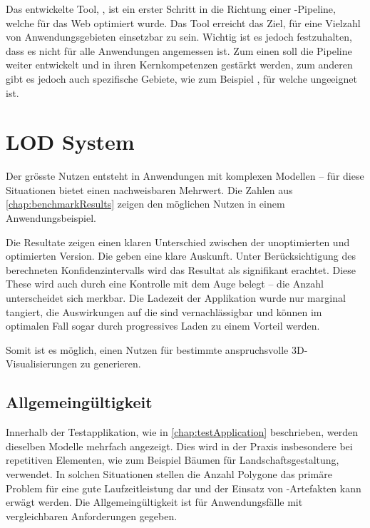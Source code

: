 Das entwickelte Tool, , ist ein erster Schritt in die Richtung einer -Pipeline, welche für das Web optimiert wurde. Das Tool erreicht das Ziel, für eine Vielzahl von Anwendungsgebieten einsetzbar zu sein. Wichtig ist es jedoch festzuhalten, dass es nicht für alle Anwendungen angemessen ist. Zum einen soll die Pipeline weiter entwickelt und in ihren Kernkompetenzen gestärkt werden, zum anderen gibt es jedoch auch spezifische Gebiete, wie zum Beispiel , für welche  ungeeignet ist.

\section{LOD System}

Der grösste Nutzen entsteht in Anwendungen mit komplexen Modellen – für diese Situationen bietet  einen nachweisbaren Mehrwert. Die Zahlen aus \autoref{chap:benchmarkResults} zeigen den möglichen Nutzen in einem Anwendungsbeispiel.

Die Resultate zeigen einen klaren Unterschied zwischen der unoptimierten und optimierten Version. Die  geben eine klare Auskunft. Unter Berücksichtigung des berechneten Konfidenzintervalls wird das Resultat als signifikant erachtet. Diese These wird auch durch eine Kontrolle mit dem Auge belegt – die Anzahl  unterscheidet sich merkbar. Die Ladezeit der Applikation wurde nur marginal tangiert, die Auswirkungen auf die  sind vernachlässigbar und können im optimalen Fall sogar durch progressives Laden zu einem Vorteil werden.

Somit ist es möglich, einen Nutzen für bestimmte anspruchsvolle 3D-Visualisierungen zu generieren.

\subsection{Allgemeingültigkeit}

Innerhalb der Testapplikation, wie in \autoref{chap:testApplication} beschrieben, werden dieselben Modelle mehrfach angezeigt. Dies wird in der Praxis insbesondere bei repetitiven Elementen, wie zum Beispiel Bäumen für Landschaftsgestaltung, verwendet. In solchen Situationen stellen die Anzahl Polygone das primäre Problem für eine gute Laufzeitleistung dar und der Einsatz von -Artefakten kann erwägt werden. Die Allgemeingültigkeit ist für Anwendungsfälle mit vergleichbaren Anforderungen gegeben.

